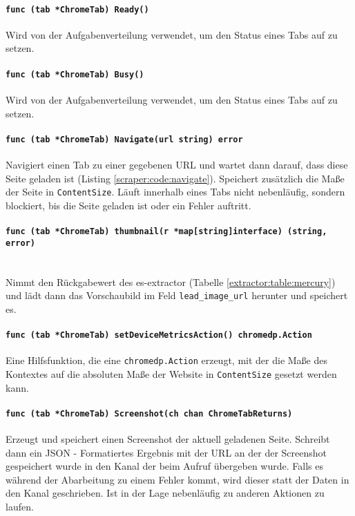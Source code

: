 \paragraph{\texttt{func (tab *ChromeTab) Ready()}} Wird von der Aufgabenverteilung verwendet, um den Status eines Tabs auf  zu setzen.
\paragraph{\texttt{func (tab *ChromeTab) Busy()}} Wird von der Aufgabenverteilung verwendet, um den Status eines Tabs auf  zu setzen.
\paragraph{\texttt{func (tab *ChromeTab) Navigate(url string) error}} Navigiert einen Tab zu einer gegebenen URL und wartet dann darauf, dass diese Seite geladen ist (Listing \ref{scraper:code:navigate}). Speichert zusätzlich die Maße der Seite in \verb|ContentSize|. Läuft innerhalb eines Tabs nicht nebenläufig, sondern blockiert, bis die Seite geladen ist oder ein Fehler auftritt. 
\paragraph{\texttt{func (tab *ChromeTab) thumbnail(r *map[string]interface{}) (string, error)}} \text{ }\\ Nimmt den Rückgabewert des es-extractor (Tabelle \ref{extractor:table:mercury}) und lädt dann das Vorschaubild im Feld \verb|lead_image_url| herunter und speichert es. 
\paragraph{\texttt{func (tab *ChromeTab) setDeviceMetricsAction() chromedp.Action}}
Eine Hilfsfunktion, die eine \verb|chromedp.Action| erzeugt, mit der die Maße des Kontextes auf die absoluten Maße der Website in \verb|ContentSize| gesetzt werden kann.
\paragraph{\texttt{func (tab *ChromeTab) Screenshot(ch chan ChromeTabReturns)}} Erzeugt und speichert einen Screenshot der aktuell geladenen Seite. Schreibt dann ein JSON - Formatiertes Ergebnis mit der URL an der der Screenshot gespeichert wurde in den Kanal der beim Aufruf übergeben wurde. Falls es während der Abarbeitung zu einem Fehler kommt, wird dieser statt der Daten in den Kanal geschrieben. Ist in der Lage nebenläufig zu anderen Aktionen zu laufen.

